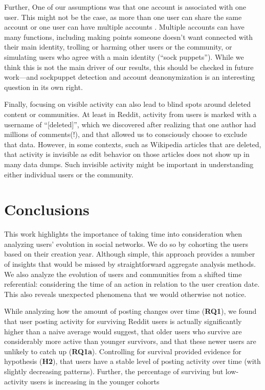 Further, One of our assumptions was that one account is associated with one user. This might not be the case, as more than one user can share the same account \cite{Lampinen2014} or one user can have multiple accounts \cite{Bergstrom2011}.  Multiple accounts can have many functions, including making points someone doesn't want connected with their main identity, trolling or harming other users or the community, or simulating users who agree with a main identity (``sock puppets'').  While we think this is not the main driver of our results, this should be checked in future work---and sockpuppet detection and account deanonymization is an interesting question in its own right.

Finally, focusing on visible activity can also lead to blind spots around deleted content or communities.  At least in Reddit, activity from users is marked with a username of ``[deleted]'', which we discovered after realizing that one author had millions of comments(!), and that allowed us to consciously choose to exclude that data.  However, in some contexts, such as Wikipedia articles that are deleted, that activity is invisible as edit behavior on those articles does not show up in many data dumps.  Such invisible activity might be important in understanding either individual users or the community. 

\section{Conclusions}

This work highlights the importance of taking time into consideration when analyzing users' evolution in social networks. We do so by cohorting the users based on their creation year. Although simple, this approach provides a number of insights that would be missed by straightforward aggregate analysis methods.  We also analyze the evolution of users and communities from a shifted time referential: considering the time of an action in relation to the user creation date. This also reveals unexpected phenomena that we would otherwise not notice.

While analyzing how the amount of posting changes over time (\textbf{RQ1}), we found that user posting activity for surviving Reddit users is actually significantly higher than a naive average would suggest, that older users who survive are considerably more active than younger survivors, and that these newer users are unlikely to catch up (\textbf{RQ1a}).  Controlling for survival provided evidence for hypothesis (\textbf{H2}), that users have a stable level of posting activity over time (with slightly decreasing patterns).  Further, the percentage of surviving but low-activity users is increasing in the younger cohorts 

